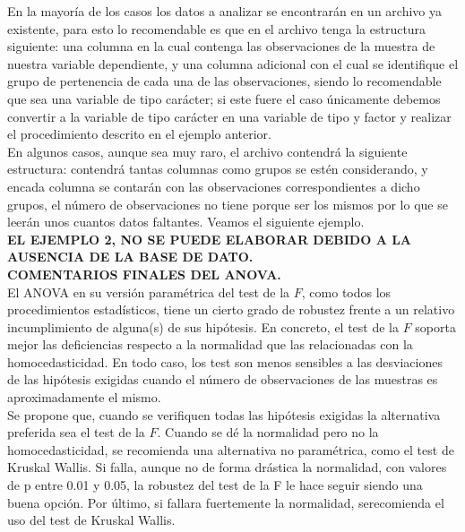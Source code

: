 \documentclass[12pt,letterpaper]{article}\usepackage[]{graphicx}\usepackage[]{color}
\begin{document}
En la mayor\'ia de los casos los datos a analizar se encontrar\'an en un archivo ya existente, para esto lo recomendable es que en el archivo tenga la estructura siguiente: una columna en la cual contenga las observaciones de la muestra de nuestra variable dependiente, y una columna adicional con el cual se identifique el grupo de pertenencia de cada una de las observaciones, siendo lo recomendable que sea una variable de tipo car\'acter; si este fuere el caso \'unicamente debemos convertir a la variable de tipo car\'acter en una variable de tipo y factor y realizar el procedimiento descrito en el ejemplo anterior.\\

En algunos casos, aunque sea muy raro, el archivo contendr\'a la siguiente estructura: contendr\'a tantas columnas como grupos se est\'en considerando, y encada columna se contar\'an con las observaciones correspondientes a dicho grupos, el n\'umero de observaciones no tiene porque ser los mismos por lo que se leer\'an unos cuantos datos faltantes. Veamos el siguiente ejemplo.\\

\textbf{ EL EJEMPLO 2, NO SE PUEDE ELABORAR DEBIDO A LA AUSENCIA DE LA BASE DE DATO.}\\

\textbf{COMENTARIOS FINALES DEL ANOVA.}\\

El ANOVA en su versi\'on param\'etrica del test de la $F$, como todos los procedimientos estad\'isticos, tiene un cierto grado de robustez frente a un relativo incumplimiento de alguna(s) de sus hip\'otesis. En concreto, el test de la $F$ soporta mejor las deficiencias respecto a la normalidad que las relacionadas con la homocedasticidad. En todo caso, los test son menos sensibles a las desviaciones de las hip\'otesis exigidas cuando el n\'umero de observaciones de las muestras es aproximadamente el mismo.\\

Se propone que, cuando se verifiquen todas las hip\'otesis exigidas la alternativa preferida sea el test de la $F$. Cuando se d\'e la normalidad pero no la homocedasticidad, se recomienda una alternativa no param\'etrica, como el test de Kruskal Wallis. Si falla, aunque no de forma dr\'astica la normalidad, con valores de p entre 0.01 y 0.05, la robustez del test de la F le hace seguir siendo una buena opci\'on. Por \'ultimo, si fallara fuertemente la normalidad, serecomienda el uso del test de Kruskal Wallis.
\end{document}
